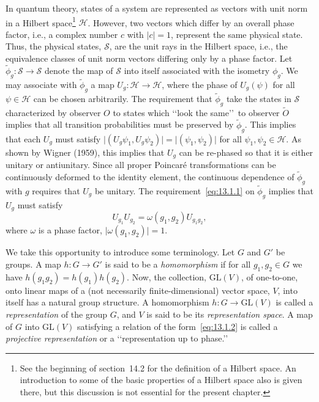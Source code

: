 In quantum theory, states of a system are represented as vectors with unit norm in a
Hilbert space\footnote{See the beginning of section~14.2 for the definition of a
Hilbert space. An introduction to some of the basic properties of a Hilbert space also
is given there, but this discussion is not essential for the present chapter.}
\(\mathcal H\). However, two vectors which differ by an overall phase factor, i.e.,
a complex number \(c\) with \(\lvert c\rvert=1\), represent the same physical state.
Thus, the physical states, \(\mathcal S\), are the unit rays in the Hilbert space,
i.e., the equivalence classes of unit norm vectors differing only by a phase factor.
Let \(\widetilde\phi_g:\mathcal S\longrightarrow\mathcal S\) denote the map of
\(\mathcal S\) into itself associated with the isometry \(\phi_g\). We may associate
with \(\widetilde\phi_g\) a map \(U_g:\mathcal H\longrightarrow\mathcal H\), where
the phase of \(U_g(\psi)\) for all \(\psi\in\mathcal H\) can be chosen arbitrarily.
The requirement that \(\widetilde\phi_g\) take the states in \(\mathcal S\)
characterized by observer \(O\) to states which \lq\lq look the same\rq\rq\ to
observer \(\widetilde O\) implies that all transition probabilities must be preserved
by \(\widetilde\phi_g\). This implies that each \(U_g\) must satisfy
\(\lvert(U_g\psi_1,U_g\psi_2)\rvert=\lvert(\psi_1,\psi_2)\rvert\) for all
\(\psi_1,\psi_2\in\mathcal H\). As shown by Wigner (1959), this implies that \(U_g\)
can be re-phased so that it is either unitary or antiunitary. Since all proper
Poincar\'e transformations can be continuously deformed to the identity element, the
continuous dependence of \(\widetilde\phi_g\) with \(g\) requires that \(U_g\) be
unitary. The requirement~\eqref{eq:13.1.1} on \(\widetilde\phi_g\) implies that
\(U_g\) must satisfy
\begin{equation}
  U_{g_1}U_{g_2}=\omega(g_1,g_2)U_{g_1g_2},
  \tag{13.1.2}\label{eq:13.1.2}
\end{equation}
where \(\omega\) is a phase factor,
\(\lvert\omega(g_1,g_2)\rvert=1\).

We take this opportunity to introduce some terminology. Let \(G\) and \(G'\) be
groups. A map \(h:G\longrightarrow G'\) is said to be a \emph{homomorphism} if for
all \(g_1,g_2\in G\) we have \(h(g_1g_2)=h(g_1)h(g_2)\). Now, the collection,
\(\mathrm{GL}(V)\), of one-to-one, onto linear maps of a (not necessarily
finite-dimensional) vector space, \(V\), into itself has a natural group structure.
A homomorphism \(h:G\longrightarrow\mathrm{GL}(V)\) is called a
\emph{representation} of the group \(G\), and \(V\) is said to be its
\emph{representation space}. A map of \(G\) into \(\mathrm{GL}(V)\) satisfying a
relation of the form~\eqref{eq:13.1.2} is called a \emph{projective representation}
or a \lq\lq representation up to phase.\rq\rq\

